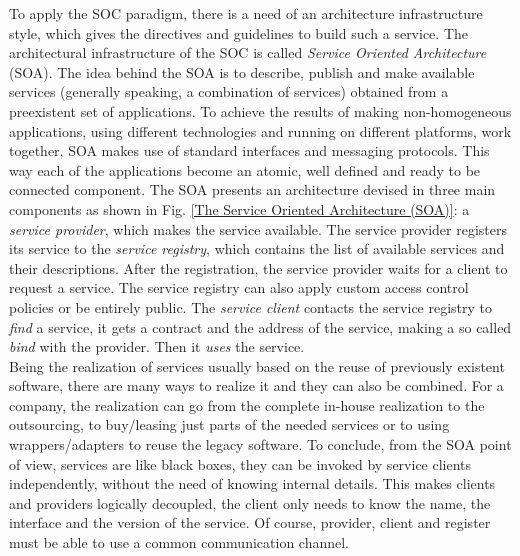 To apply the SOC paradigm, there is a need of an architecture infrastructure style, which gives the directives and guidelines to build such a service.  
The architectural infrastructure of the SOC is called \textit{Service Oriented Architecture} (SOA). 
The idea behind the SOA is to describe, publish and make available services (generally speaking, a combination of services) obtained from a preexistent set of applications. 
To achieve the results of making non-homogeneous applications, using different technologies and running on different platforms, work together, SOA makes use of standard interfaces and messaging protocols. This way each of the applications become an atomic, well defined and ready to be connected component. 
The SOA presents an architecture devised in three main components \cite{Pernici04} as shown in Fig. \ref{The Service Oriented Architecture (SOA)}:
a \textit{service provider}, which makes the service available. The service provider registers its service to the \textit{service registry}, which contains the list of available services and their descriptions. After the registration, the service provider waits for a client to request a service. The service registry can also apply custom access control policies or be entirely public. 
The \textit{service client} contacts the service registry to \textit{find} a service, it gets a contract and the address of the service, making a so called \textit{bind} with the provider. Then it \textit{uses} the service.\\

Being the realization of services usually based on the reuse of previously existent software, there are many ways to realize it and they can also be combined. For a company, the realization can go from the complete in-house realization to the outsourcing, to buy/leasing just parts of the needed services or to using wrappers/adapters to reuse the legacy software.
To conclude, from the SOA point of view, services are like black boxes, they can be invoked by service clients independently, without the need of knowing internal details. This makes clients and providers logically decoupled, the client only needs to know the name, the interface and the version of the service. Of course, provider, client and register must be able to use a common communication channel. 

